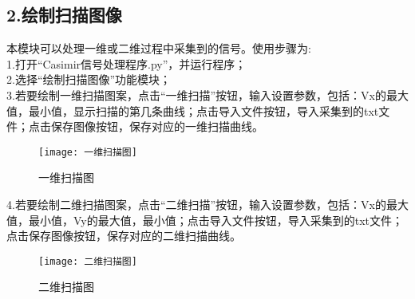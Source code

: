 \subsection*{2.绘制扫描图像}
本模块可以处理一维或二维过程中采集到的信号。使用步骤为:
\\1.打开“Casimir信号处理程序.py”，并运行程序；
\\2.选择“绘制扫描图像”功能模块；
\\3.若要绘制一维扫描图案，点击“一维扫描”按钮，输入设置参数，包括：Vx的最大值，最小值，显示扫描的第几条曲线；点击导入文件按钮，导入采集到的txt文件；点击保存图像按钮，保存对应的一维扫描曲线。
\begin{figure}[h]
	\centering
	\texttt{[image: 一维扫描图]}
	\caption{一维扫描图}
\end{figure}
4.若要绘制二维扫描图案，点击“二维扫描”按钮，输入设置参数，包括：Vx的最大值，最小值，Vy的最大值，最小值；点击导入文件按钮，导入采集到的txt文件；点击保存图像按钮，保存对应的二维扫描曲线。
\begin{figure}[h]
	\centering
	\texttt{[image: 二维扫描图]}
	\caption{二维扫描图}
\end{figure}

